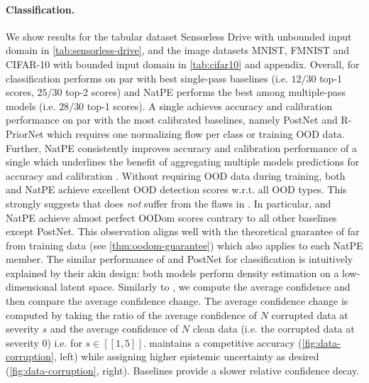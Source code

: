 \paragraph{Classification.} We show results for the tabular dataset Sensorless Drive with unbounded input domain in \cref{tab:sensorless-drive}, and the image datasets MNIST, FMNIST and CIFAR-10 with bounded input domain in \cref{tab:cifar10} and appendix. Overall, for classification \NatPNacro{} performs on par with best single-pass baselines (i.e. $12/30$ top-1 scores, $25/30$ top-2 scores) and NatPE performs the best among multiple-pass models (i.e. $28/30$ top-1 scores). A single \NatPNacro{} achieves accuracy and calibration performance on par with the most calibrated baselines, namely PostNet and R-PriorNet which requires one normalizing flow per class or training OOD data. Further, NatPE consistently improves accuracy and calibration performance of a single \NatPNacro{} which underlines the benefit of aggregating multiple models predictions for accuracy and calibration \citep{ensembles}. Without requiring OOD data during training, both \NatPNacro{} and NatPE achieve excellent OOD detection scores w.r.t. all OOD types. This strongly suggests that \NatPNacro{} does \emph{not} suffer from the flaws in \cite{anomaly-detection,deep-generative,typicality_OOD_generative}. In particular, \NatPNacro{} and NatPE achieve almost perfect OODom scores contrary to all other baselines except PostNet. This observation aligns well with the theoretical guarantee of \NatPNacro{} far from training data (see \cref{thm:oodom-guarantee}) which also applies to each NatPE member. The similar performance of \NatPNacro{} and PostNet for classification is intuitively explained by their akin design: both models perform density estimation on a low-dimensional latent space. Similarly to \cite{charpentier2020}, we compute the average confidence  and then compare the average confidence change. The average confidence change is computed by taking the ratio of the average confidence of $N$ corrupted data at severity $s$ and the average confidence of $N$ clean data (i.e. the corrupted data at severity $0$) i.e.  for $s \in [\![ 1, 5 ]\!]$. \NatPNacro{} maintains a competitive accuracy (\cref{fig:data-corruption}, left) while assigning higher epistemic uncertainty as desired (\cref{fig:data-corruption}, right). Baselines provide a slower relative confidence decay.


